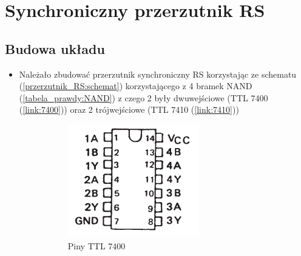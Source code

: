 \chapter{Synchroniczny przerzutnik RS}

\section{Budowa układu}

\begin{itemize}
    \item Należało zbudować przerzutnik synchroniczny RS korzystając ze schematu (\ref{przerzutnik_RS:schemat}) korzystającego z 4 bramek NAND (\ref{tabela_prawdy:NAND}) z czego 2 były dwuwejściowe (TTL 7400 (\ref{link:7400})) oraz 2 trójwejściowe (TTL 7410 (\ref{link:7410}))
        \begin{figure}[H]
            \centering
            \begin{subfigure}[H]{0.45\textwidth}
                \includegraphics[width=\textwidth]{img/schemes/7400_pins.png}
                \caption{Piny TTL 7400}
            \end{subfigure}
            \begin{subfigure}[H]{0.45\textwidth}

\end{subfigure}
\end{figure}
\end{itemize}
